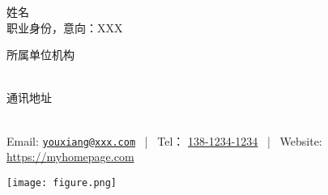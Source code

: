 \documentclass[UTF8, 5pt, a4paper]{ctexart}
\makeatletter
\newcommand{\MyName}{姓名}
\newcommand{\MyRole}{职业身份，意向：XXX}
\newcommand{\Affiliation}{
    所属单位机构
}
\newcommand{\Address}{
    通讯地址
}
\newcommand{\Phone}{138-1234-1234}
\newcommand{\Email}{youxiang@xxx.com}
\newcommand{\Website}{https://myhomepage.com}
\makeatother
\begin{document}
\begin{minipage}[b]{0.8\linewidth}
    \begin{center}
        {\fontsize{36pt}{0}\selectfont \MyName}
        \\[0.5cm]
        {\fontsize{16pt}{0}\selectfont \MyRole}
        \\[0.3cm]
        {\fontsize{10pt}{0}\selectfont
            \Affiliation
            \\[0.2cm]
            \Address
            \\[0.08cm]
            Email: \href{mailto:\Email}{\texttt{\Email}}
            \, | \,
            Tel： \url{\Phone}
            \, | \,
            Website: \url{\Website}
        }
    \end{center}
\end{minipage}
\hfill
\begin{minipage}[b]{0.2\linewidth}
\texttt{[image: figure.png]}
\end{minipage}

\begin{multicols}{2}
\end{multicols}
\end{document}
